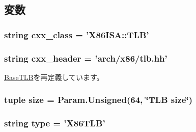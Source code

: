 \subsection{変数}
\hypertarget{classX86TLB_1_1X86TLB_a58cd55cd4023648e138237cfc0822ae3}{
\subsubsection[{cxx\_\-class}]{\setlength{\rightskip}{0pt plus 5cm}string {\bf cxx\_\-class} = '{\bf X86ISA::TLB}'}}
\label{classX86TLB_1_1X86TLB_a58cd55cd4023648e138237cfc0822ae3}
\hypertarget{classX86TLB_1_1X86TLB_a17da7064bc5c518791f0c891eff05fda}{
\subsubsection[{cxx\_\-header}]{\setlength{\rightskip}{0pt plus 5cm}string {\bf cxx\_\-header} = 'arch/x86/tlb.hh'}}
\label{classX86TLB_1_1X86TLB_a17da7064bc5c518791f0c891eff05fda}


\hyperlink{classBaseTLB_1_1BaseTLB_a17da7064bc5c518791f0c891eff05fda}{BaseTLB}を再定義しています。\hypertarget{classX86TLB_1_1X86TLB_a377e5da8df1f89c5468c8b8cd07eac89}{
\subsubsection[{size}]{\setlength{\rightskip}{0pt plus 5cm}tuple {\bf size} = Param.Unsigned(64, \char`\"{}TLB {\bf size}\char`\"{})}}
\label{classX86TLB_1_1X86TLB_a377e5da8df1f89c5468c8b8cd07eac89}
\hypertarget{classX86TLB_1_1X86TLB_acce15679d830831b0bbe8ebc2a60b2ca}{
\subsubsection[{type}]{\setlength{\rightskip}{0pt plus 5cm}string {\bf type} = '{\bf X86TLB}'}}
\label{classX86TLB_1_1X86TLB_acce15679d830831b0bbe8ebc2a60b2ca}


